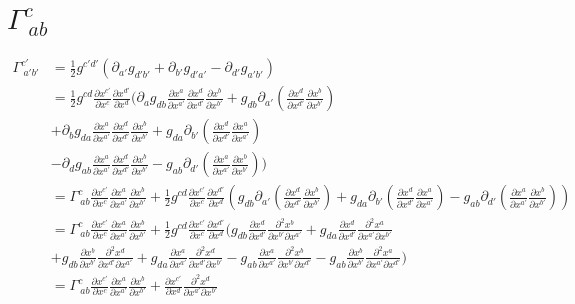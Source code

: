 \documentclass{article}
\begin{document}
\section{$\Gamma^{c}_{~ab}$}
\begin{align*}
\Gamma^{c'}_{~a'b'} & = \frac{1}{2}g^{c'd'}(\partial_{a'}g_{d'b'} + \partial_{b'}g_{d'a'} - \partial_{d'}g_{a'b'})\\
& = \frac{1}{2}g^{cd}\frac{\partial x^{c'}}{\partial x^{c}}\frac{\partial x^{d'}}{\partial x^{d}}(\partial_{a}g_{db}\frac{\partial x^{a}}{\partial x^{a'}}\frac{\partial x^{d}}{\partial x^{d'}}\frac{\partial x^{b}}{\partial x^{b'}} + g_{db}\partial_{a'}(\frac{\partial x^{d}}{\partial x^{d'}}\frac{\partial x^{b}}{\partial x^{b'}})\\
&+ \partial_{b}g_{da}\frac{\partial x^{a}}{\partial x^{a'}}\frac{\partial x^{d}}{\partial x^{d'}}\frac{\partial x^{b}}{\partial x^{b'}} + g_{da}\partial_{b'}(\frac{\partial x^{d}}{\partial x^{d'}}\frac{\partial x^{a}}{\partial x^{a'}})\\
&- \partial_{d}g_{ab}\frac{\partial x^{a}}{\partial x^{a'}}\frac{\partial x^{d}}{\partial x^{d'}}\frac{\partial x^{b}}{\partial x^{b'}} - g_{ab}\partial_{d'}(\frac{\partial x^{a}}{\partial x^{a'}}\frac{\partial x^{b}}{\partial x^{b'}}))\\
& = \Gamma^{c}_{~ab}\frac{\partial x^{c'}}{\partial x^{c}}\frac{\partial x^{a}}{\partial x^{a'}}\frac{\partial x^{b}}{\partial x^{b'}} + \frac{1}{2}g^{cd}\frac{\partial x^{c'}}{\partial x^{c}}\frac{\partial x^{d'}}{\partial x^{d}}(g_{db}\partial_{a'}(\frac{\partial x^{d}}{\partial x^{d'}}\frac{\partial x^{b}}{\partial x^{b'}}) + g_{da}\partial_{b'}(\frac{\partial x^{d}}{\partial x^{d'}}\frac{\partial x^{a}}{\partial x^{a'}}) -  g_{ab}\partial_{d'}(\frac{\partial x^{a}}{\partial x^{a'}}\frac{\partial x^{b}}{\partial x^{b'}}))\\
& = \Gamma^{c}_{~ab}\frac{\partial x^{c'}}{\partial x^{c}}\frac{\partial x^{a}}{\partial x^{a'}}\frac{\partial x^{b}}{\partial x^{b'}} + \frac{1}{2}g^{cd}\frac{\partial x^{c'}}{\partial x^{c}}\frac{\partial x^{d'}}{\partial x^{d}}(g_{db}\frac{\partial x^{d}}{\partial x^{d'}}\frac{\partial^2 x^{b}}{\partial x^{b'}\partial x^{a'}} + g_{da}\frac{\partial x^{d}}{\partial x^{d'}}\frac{\partial^2 x^{a}}{\partial x^{a'}\partial x^{b'}} \\
& + g_{db}\frac{\partial x^{b}}{\partial x^{b'}}\frac{\partial^2 x^{d}}{\partial x^{d'}\partial x^{a'}} + g_{da}\frac{\partial x^{a}}{\partial x^{a'}}\frac{\partial^2 x^{d}}{\partial x^{d'}\partial x^{b'}} - g_{ab}\frac{\partial x^{a}}{\partial x^{a'}}\frac{\partial^2 x^{b}}{\partial x^{b'}\partial x^{d'}} - g_{ab}\frac{\partial x^{b}}{\partial x^{b'}}\frac{\partial^2 x^{a}}{\partial x^{a'}\partial x^{d'}})\\
& = \Gamma^{c}_{~ab}\frac{\partial x^{c'}}{\partial x^{c}}\frac{\partial x^{a}}{\partial x^{a'}}\frac{\partial x^{b}}{\partial x^{b'}} + \frac{\partial x^{c'}}{\partial x^{d}}\frac{\partial^2 x^{d}}{\partial x^{a'}\partial x^{b'}}
\end{align*}
\end{document}
